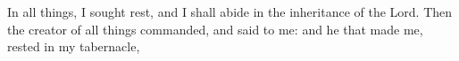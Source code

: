 \noindent In all things, I sought rest, and I shall abide in the inheritance of the Lord. Then the creator of all things commanded, and said to me: and he that made me, rested in my tabernacle, 